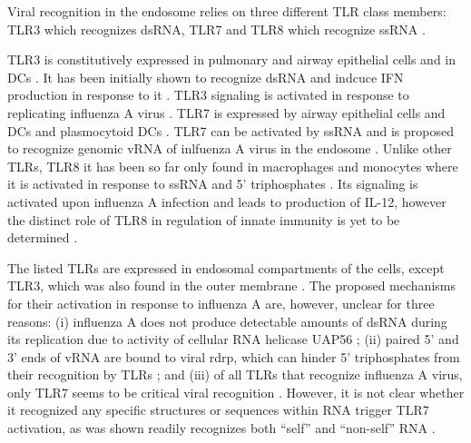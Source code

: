 		Viral recognition in the endosome relies on three different \gls{TLR} class members: \gls{TLR}3 which recognizes dsRNA, \gls{TLR}7 and \gls{TLR}8 which recognize ssRNA \parencite{Iwasaki2014}. 
		
		\gls{TLR}3 is constitutively expressed in pulmonary and airway epithelial  cells and in \glspl{DC} \parencite{Guillot2005, Schulz2005, Ioannidis2013}. It has been initially shown to recognize dsRNA and indcuce \gls{IFN} production in response to it \parencite{Alexopoulou2001, Guillot2005}. \gls{TLR}3 signaling is activated in response to replicating influenza A virus \parencite{Guillot2005}. 	\gls{TLR}7 is expressed by airway epithelial cells and \gls{DC}s and plasmocytoid \gls{DC}s \parencite{Ioannidis2013, Lund2004}. \gls{TLR}7 can be activated by ssRNA and is proposed to recognize genomic vRNA of inlfuenza A virus in the endosome \parencite{Diebold2004}. Unlike other \glspl{TLR}, \gls{TLR}8 it has been so far only found in macrophages and monocytes where it is activated in response to ssRNA and 5' triphosphates \parencite{Ablasser2009}. Its signaling is activated upon influenza A infection and leads to production of \gls{IL}-12, however the distinct role of \gls{TLR}8 in regulation of innate immunity is yet to be determined \parencite{Lee2013a}.
		
		
		The listed \gls{TLR}s are expressed in endosomal compartments of the cells, except \gls{TLR}3, which was also found in the outer membrane \parencite{Schulz2005, Ablasser2009, Diebold2004}. The proposed mechanisms for their activation in response to influenza A are, however, unclear for three reasons: (i) influenza A does not produce detectable amounts of dsRNA during its replication due to activity of cellular RNA helicase UAP56 \parencite{Wisskirchen2011}; (ii) paired 5' and 3' ends of vRNA are bound to viral \gls{rdrp}, which can hinder 5' triphosphates from their recognition by \glspl{TLR} \parencite{Arranz2012}; and (iii) of all \glspl{TLR} that recognize influenza A virus, only \gls{TLR}7 seems to be critical viral recognition \parencite{Lund2004}. However, it is not clear whether it recognized any specific structures or sequences within RNA trigger \gls{TLR}7 activation, as  was shown readily recognizes both ``self'' and ``non-self'' RNA \parencite{Diebold2004}.
		
